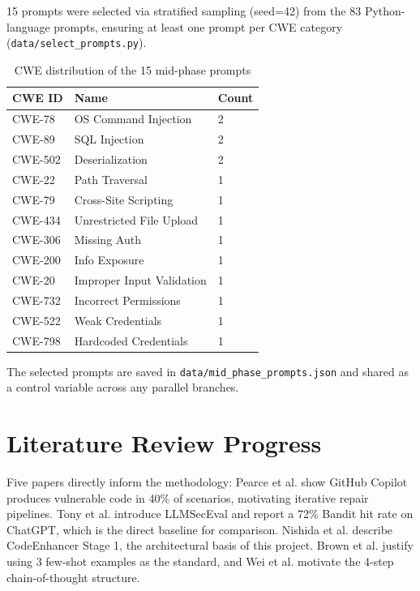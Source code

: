 \documentclass[10pt,a4paper]{article}
\begin{document}
15 prompts were selected via stratified sampling (seed=42) from the 83 Python-language prompts, ensuring at least one prompt per CWE category (\texttt{data/select\_prompts.py}).

\begin{table}[h]
\centering
\caption{CWE distribution of the 15 mid-phase prompts}
\begin{tabular}{lll}
\toprule
\textbf{CWE ID} & \textbf{Name} & \textbf{Count} \\
\midrule
CWE-78  & OS Command Injection        & 2 \\
CWE-89  & SQL Injection               & 2 \\
CWE-502 & Deserialization             & 2 \\
CWE-22  & Path Traversal              & 1 \\
CWE-79  & Cross-Site Scripting        & 1 \\
CWE-434 & Unrestricted File Upload    & 1 \\
CWE-306 & Missing Auth                & 1 \\
CWE-200 & Info Exposure               & 1 \\
CWE-20  & Improper Input Validation   & 1 \\
CWE-732 & Incorrect Permissions       & 1 \\
CWE-522 & Weak Credentials            & 1 \\
CWE-798 & Hardcoded Credentials       & 1 \\
\bottomrule
\end{tabular}
\label{tab:cwe_dist}
\end{table}

The selected prompts are saved in \texttt{data/mid\_phase\_prompts.json} and shared as a control variable across any parallel branches.

\section{Literature Review Progress}

Five papers directly inform the methodology: Pearce et al. \cite{pearce2022asleep} show GitHub Copilot produces vulnerable code in 40\% of scenarios, motivating iterative repair pipelines. Tony et al. \cite{tony2023llmseceval} introduce LLMSecEval and report a 72\% Bandit hit rate on ChatGPT, which is the direct baseline for comparison. Nishida et al. \cite{nishida2024codeenhancer} describe CodeEnhancer Stage 1, the architectural basis of this project. Brown et al. \cite{brown2020gpt3} justify using 3 few-shot examples as the standard, and Wei et al. \cite{wei2022cot} motivate the 4-step chain-of-thought structure.
\end{document}
